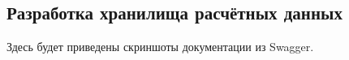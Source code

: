 \subsection{\large{Разработка хранилища расчётных данных}}

Здесь будет приведены скриншоты документации из Swagger.